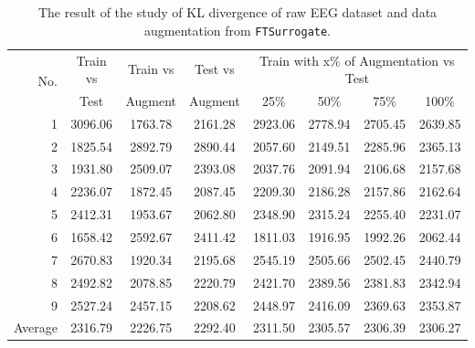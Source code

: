 \begin{table}[ht!]
    \centering
    \caption[The result of KL divergence]{The result of the study of KL divergence of raw EEG dataset and data augmentation from \texttt{FTSurrogate}.}
    \label{tab:KL-FTSurrogate}
        {\small\begin{tabular}{rccccccc}
        \hline
        \multirow{2}{*}{No.} & Train vs & Train vs & Test vs & \multicolumn{4}{c}{Train with x\% of Augmentation vs Test} \\ 
        \cline{5-8} 
                             & Test     & Augment  & Augment & 25\%          & 50\%         & 75\%         & 100\%        \\
        \hline
        1                    & 3096.06  & 1763.78  & 2161.28 & 2923.06       & 2778.94      & 2705.45      & 2639.85      \\
        2                    & 1825.54  & 2892.79  & 2890.44 & 2057.60       & 2149.51      & 2285.96      & 2365.13      \\
        3                    & 1931.80  & 2509.07  & 2393.08 & 2037.76       & 2091.94      & 2106.68      & 2157.68      \\
        4                    & 2236.07  & 1872.45  & 2087.45 & 2209.30       & 2186.28      & 2157.86      & 2162.64      \\
        5                    & 2412.31  & 1953.67  & 2062.80 & 2348.90       & 2315.24      & 2255.40      & 2231.07      \\
        6                    & 1658.42  & 2592.67  & 2411.42 & 1811.03       & 1916.95      & 1992.26      & 2062.44      \\
        7                    & 2670.83  & 1920.34  & 2195.68 & 2545.19       & 2505.66      & 2502.45      & 2440.79      \\
        8                    & 2492.82  & 2078.85  & 2220.79 & 2421.70       & 2389.56      & 2381.83      & 2342.94      \\
        9                    & 2527.24  & 2457.15  & 2208.62 & 2448.97       & 2416.09      & 2369.63      & 2353.87      \\\hline
        Average              & 2316.79  & 2226.75  & 2292.40 & 2311.50       & 2305.57      & 2306.39      & 2306.27      \\
        \hline
        \end{tabular}}
\end{table}

